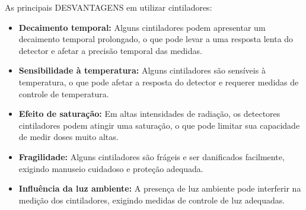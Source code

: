 \documentclass[11pt,a4paper]{article}
\begin{document}
		As principais \textcolor{CarnationPink}{DESVANTAGENS}  em utilizar cintiladores:

		\begin{itemize}[label=\textcolor{CarnationPink}{$\blacktriangleright$}]
			\item \textbf{Decaimento temporal:} Alguns cintiladores podem apresentar um decaimento temporal prolongado, o que pode levar a uma resposta lenta do detector e afetar a precisão temporal das medidas.
			\item \textbf{Sensibilidade à temperatura:} Alguns cintiladores são sensíveis à temperatura, o que pode afetar a resposta do detector e requerer medidas de controle de temperatura.
			\item \textbf{Efeito de saturação:} Em altas intensidades de radiação, os detectores cintiladores podem atingir uma saturação, o que pode limitar sua capacidade de medir doses muito altas.
			\item \textbf{Fragilidade:} Alguns cintiladores são frágeis e ser danificados facilmente, exigindo manuseio cuidadoso e proteção adequada.			
			\item \textbf{Influência da luz ambiente:} A presença de luz ambiente pode interferir na medição dos cintiladores, exigindo medidas de controle de luz adequadas.
		\end{itemize}

		




\end{document}
